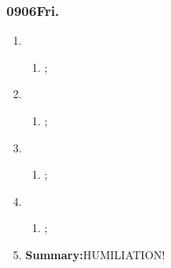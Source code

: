 \subsubsection{0906Fri.}
\begin{enumerate}
	\item \ncquaone
	\begin{enumerate}[(1)]
		\item ;\rightundoneBlack
	\end{enumerate}
	
	\item \ncquatwo	
	\begin{enumerate}[(1)]
		\item ;\rightundoneBlack
	\end{enumerate}
	
	\item \ncquathree
	\begin{enumerate}[(1)]
		\item ;\rightundoneBlack
	\end{enumerate}
	
	\item \ncquafour	
	\begin{enumerate}[(1)]
		\item ;\rightundoneBlack
	\end{enumerate}
	\item \textbf{Summary:}HUMILIATION! 
\end{enumerate}

